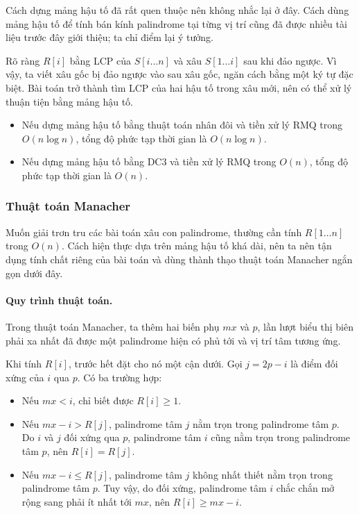 \documentclass[11pt]{article}
\begin{document}
Cách dựng mảng hậu tố đã rất quen thuộc nên không nhắc lại ở đây. Cách dùng
mảng hậu tố để tính bán kính palindrome tại từng vị trí cũng đã được nhiều tài
liệu trước đây giới thiệu; ta chỉ điểm lại ý tưởng.

Rõ ràng \(R[i]\) bằng LCP của \(S[i\ldots n]\) và xâu \(S[1\ldots i]\) sau khi
đảo ngược. Vì vậy, ta viết xâu gốc bị đảo ngược vào sau xâu gốc, ngăn cách bằng
một ký tự đặc biệt. Bài toán trở thành tìm LCP của hai hậu tố trong xâu mới,
nên có thể xử lý thuận tiện bằng mảng hậu tố.

\begin{itemize}
  \item Nếu dựng mảng hậu tố bằng thuật toán nhân đôi và tiền xử lý RMQ trong
  \(O(n\log n)\), tổng độ phức tạp thời gian là \(O(n\log n)\).
  \item Nếu dựng mảng hậu tố bằng DC3 và tiền xử lý RMQ trong \(O(n)\), tổng độ
  phức tạp thời gian là \(O(n)\).
\end{itemize}

\subsubsection{Thuật toán Manacher}

Muốn giải trơn tru các bài toán xâu con palindrome, thường cần tính
\(R[1\ldots n]\) trong \(O(n)\). Cách hiện thực dựa trên mảng hậu tố khá dài,
nên ta nên tận dụng tính chất riêng của bài toán và dùng thành thạo thuật toán
Manacher ngắn gọn dưới đây.

\paragraph{Quy trình thuật toán.}
Trong thuật toán Manacher, ta thêm hai biến phụ \(mx\) và \(p\), lần lượt biểu
thị biên phải xa nhất đã được một palindrome hiện có phủ tới và vị trí tâm
tương ứng.

Khi tính \(R[i]\), trước hết đặt cho nó một cận dưới. Gọi \(j=2p-i\) là điểm
đối xứng của \(i\) qua \(p\). Có ba trường hợp:
\begin{itemize}
  \item Nếu \(mx<i\), chỉ biết được \(R[i]\ge1\).
  \item Nếu \(mx-i>R[j]\), palindrome tâm \(j\) nằm trọn trong palindrome tâm
  \(p\). Do \(i\) và \(j\) đối xứng qua \(p\), palindrome tâm \(i\) cũng nằm
  trọn trong palindrome tâm \(p\), nên \(R[i]=R[j]\).
  \item Nếu \(mx-i\le R[j]\), palindrome tâm \(j\) không nhất thiết nằm trọn
  trong palindrome tâm \(p\). Tuy vậy, do đối xứng, palindrome tâm \(i\) chắc
  chắn mở rộng sang phải ít nhất tới \(mx\), nên \(R[i]\ge mx-i\).
\end{itemize}
\end{document}

